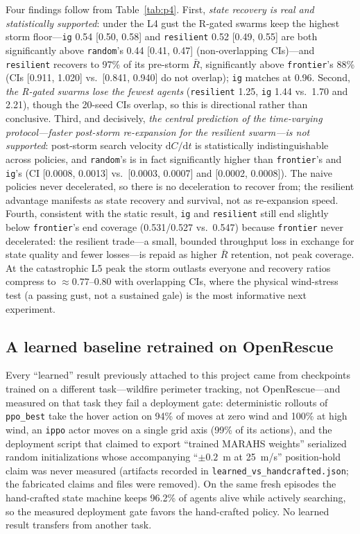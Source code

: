 \documentclass[12pt,a4paper]{article}
\begin{document}
Four findings follow from Table~\ref{tab:p4}. First, \emph{state recovery is
real and statistically supported}: under the L4 gust the R-gated swarms keep
the highest storm floor---\texttt{ig} 0.54 [0.50, 0.58] and
\texttt{resilient} 0.52 [0.49, 0.55] are both significantly above
\texttt{random}'s 0.44 [0.41, 0.47] (non-overlapping CIs)---and
\texttt{resilient} recovers to 97\% of its pre-storm $\bar R$, significantly
above \texttt{frontier}'s 88\% (CIs [0.911, 1.020] vs.~[0.841, 0.940] do not
overlap); \texttt{ig} matches at 0.96. Second, \emph{the R-gated swarms lose
the fewest agents} (\texttt{resilient} 1.25, \texttt{ig} 1.44 vs.~1.70 and
2.21), though the 20-seed CIs overlap, so this is directional rather than
conclusive. Third, and decisively, \emph{the central prediction of the
time-varying protocol---faster post-storm re-expansion for the resilient
swarm---is not supported}: post-storm search velocity $\mathrm{d}C/\mathrm{d}t$
is statistically indistinguishable across policies, and \texttt{random}'s is
in fact significantly higher than \texttt{frontier}'s and \texttt{ig}'s (CI
[0.0008, 0.0013] vs.~[0.0003, 0.0007] and [0.0002, 0.0008]). The naive
policies never decelerated, so there is no deceleration to recover from; the
resilient advantage manifests as state recovery and survival, not as
re-expansion speed. Fourth, consistent with the static result, \texttt{ig}
and \texttt{resilient} still end slightly below \texttt{frontier}'s end
coverage (0.531/0.527 vs.~0.547) because \texttt{frontier} never decelerated:
the resilient trade---a small, bounded throughput loss in exchange for state
quality and fewer losses---is repaid as higher $\bar R$ retention, not peak
coverage. At the catastrophic L5 peak the storm outlasts everyone and
recovery ratios compress to $\approx 0.77$--$0.80$ with overlapping CIs, where
the physical wind-stress test (a passing gust, not a sustained gale) is the
most informative next experiment.

\subsection{A learned baseline retrained on OpenRescue}
\label{sec:learned}

Every ``learned'' result previously attached to this project came from
checkpoints trained on a different task---wildfire perimeter tracking, not
OpenRescue---and measured on that task they fail a deployment gate:
deterministic rollouts of \texttt{ppo\_best} take the hover action on 94\%
of moves at zero wind and 100\% at high wind, an \texttt{ippo} actor moves
on a single grid axis (99\% of its actions), and the deployment script that
claimed to export ``trained MARAHS weights'' serialized random
initializations whose accompanying ``$\pm 0.2$~m at 25~m/s'' position-hold
claim was never measured (artifacts recorded in
\texttt{learned\_vs\_handcrafted.json}; the fabricated claims and files were
removed). On the same fresh episodes the hand-crafted state machine keeps
96.2\% of agents alive while actively searching, so the measured deployment
gate favors the hand-crafted policy. No learned result transfers from another
task.
\end{document}
